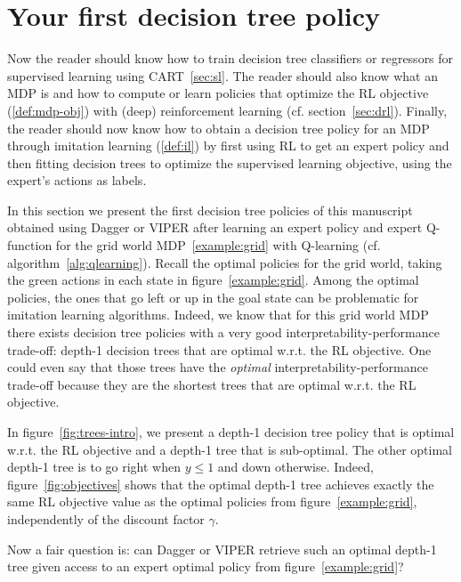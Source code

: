 \section{Your first decision tree policy}\label{sec:limits-il}
Now the reader should know how to train decision tree classifiers or regressors for supervised learning using CART~\ref{sec:sl}.
The reader should also know what an MDP is and how to compute or learn policies that optimize the RL objective (\ref{def:mdp-obj}) with (deep) reinforcement learning (cf. section~\ref{sec:drl}).
Finally, the reader should now know how to obtain a decision tree policy for an MDP through imitation learning (\ref{def:il}) by first using RL to get an expert policy and then fitting decision trees to optimize the supervised learning objective, using the expert's actions as labels.

In this section we present the first decision tree policies of this manuscript obtained using Dagger or VIPER after learning an expert policy and expert Q-function for the grid world MDP~\ref{example:grid} with Q-learning (cf. algorithm~\ref{alg:qlearning}).
Recall the optimal policies for the grid world, taking the green actions in each state in figure~\ref{example:grid}. 
Among the optimal policies, the ones that go left or up in the goal state can be problematic for imitation learning algorithms.
Indeed, we know that for this grid world MDP there exists decision tree policies with a very good interpretability-performance trade-off: depth-1 decision trees that are optimal w.r.t. the RL objective.
One could even say that those trees have the \textit{optimal} interpretability-performance trade-off because they are the shortest trees that are optimal w.r.t. the RL objective.

In figure~\ref{fig:trees-intro}, we present a depth-1 decision tree policy that is optimal w.r.t. the RL objective and a depth-1 tree that is sub-optimal.
The other optimal depth-1 tree is to go right when $y\leq 1$ and down otherwise.
Indeed, figure~\ref{fig:objectives} shows that the optimal depth-1 tree achieves exactly the same RL objective value as the optimal policies from figure~\ref{example:grid}, independently of the discount factor $\gamma$.

Now a fair question is: can Dagger or VIPER retrieve such an optimal depth-1 tree given access to an expert optimal policy from figure~\ref{example:grid}?

